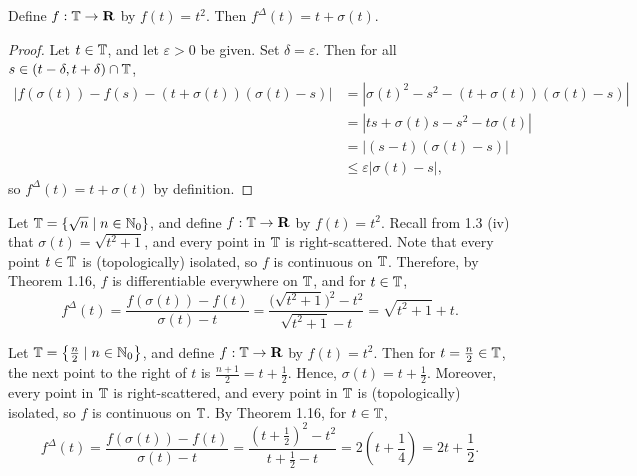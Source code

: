 \documentclass[nonumber]{homework}
\begin{document}
	
	Define $f : \mathbb{T} \to \textnormal{\bf R}$ by $f(t) = t^2$. Then $f^\Delta(t) = t + \sigma(t)$.
	
	\begin{proof}
		Let $t \in \mathbb{T}$, and let $\varepsilon > 0$ be given. Set $\delta = \varepsilon$. Then for all $s \in (t-\delta, t+\delta) \cap \mathbb{T}$,
		\begin{align*}
			|f(\sigma(t)) - f(s) - (t+\sigma(t))(\sigma(t) - s)| &= |\sigma(t)^2 - s^2 - (t+\sigma(t))(\sigma(t)-s)| \\
			&= |ts + \sigma(t)s - s^2-t\sigma(t)| \\
			&= |(s-t)(\sigma(t) - s)| \\
			&\le \varepsilon|\sigma(t)-s|,
		\end{align*}
		so $f^\Delta(t) = t + \sigma(t)$ by definition.
	\end{proof}
	
	Let $\mathbb{T} = \{\sqrt{n} \mid n \in \mathbb{N}_0\}$, and define $f : \mathbb{T} \to \textnormal{\bf R}$ by $f(t) = t^2$. Recall from 1.3 (iv) that $\sigma(t) = \sqrt{t^2+1}$, and every point in $\mathbb{T}$ is right-scattered. Note that every point $t \in \mathbb{T}$ is (topologically) isolated, so $f$ is continuous on $\mathbb{T}$. Therefore, by Theorem 1.16, $f$ is differentiable everywhere on $\mathbb{T}$, and for $t \in \mathbb{T}$,
	\begin{equation*}
		f^\Delta(t) = \frac{f(\sigma(t)) - f(t)}{\sigma(t) - t} = \frac{\big(\sqrt{t^2+1}\big)^2 - t^2}{\sqrt{t^2+1} - t} = \sqrt{t^2+1} + t.
	\end{equation*}
	
	Let $\mathbb{T} = \left\{\frac{n}{2} \mid n \in \mathbb{N}_0\right\}$, and define $f:\mathbb{T} \to\textnormal{\bf R}$ by $f(t) = t^2$. Then for $t = \frac{n}{2} \in \mathbb{T}$, the next point to the right of $t$ is $\frac{n+1}{2} = t + \frac{1}{2}$. Hence, $\sigma(t) = t + \frac{1}{2}$. Moreover, every point in $\mathbb{T}$ is right-scattered, and every point in $\mathbb{T}$ is (topologically) isolated, so $f$ is continuous on $\mathbb{T}$. By Theorem 1.16, for $t \in \mathbb{T}$,
	\begin{equation*}
		f^\Delta(t) = \frac{f(\sigma(t)) - f(t)}{\sigma(t) - t} = \frac{\left(t+\frac{1}{2}\right)^2 - t^2}{t+\frac{1}{2} - t} = 2\left(t+\frac{1}{4}\right) = 2t + \frac{1}{2}.
	\end{equation*}
	
\end{document}
